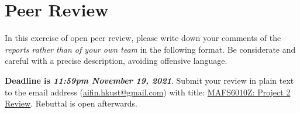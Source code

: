 \documentclass[11pt]{article}
\begin{document}
\newpage

\section*{Peer Review}

In this exercise of open peer review, please write down your comments of the \emph{reports rather than of your own team} in the following format. Be considerate and careful with a precise description, avoiding offensive language. 

{\bf Deadline is \emph{11:59pm November 19, 2021}}. Submit your review in plain text to the email address (\url{aifin.hkust@gmail.com}) with title: \underline{MAFS6010Z: Project 2 Review}. Rebuttal is open afterwards.




\end{document}
